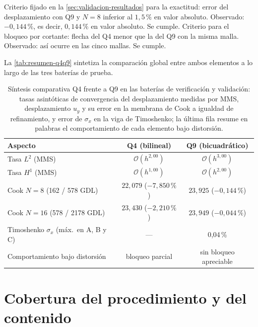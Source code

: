 Criterio fijado en la \autoref{sec:validacion-resultados} para la exactitud: error del desplazamiento con Q9 y $N=8$ inferior al $1{,}5\,\%$ en valor absoluto. Observado: $-0{,}144\,\%$, es decir, $0{,}144\,\%$ en valor absoluto. Se cumple. Criterio para el bloqueo por cortante: flecha del Q4 menor que la del Q9 con la misma malla. Observado: así ocurre en las cinco mallas. Se cumple.

La \autoref{tab:resumen-q4q9} sintetiza la comparación global entre ambos elementos a lo largo de las tres baterías de prueba.

\begin{table}[htbp]
\centering
\caption[Síntesis comparativa Q4 frente a Q9 en las baterías de verificación y validación.]{Síntesis comparativa Q4 frente a Q9 en las baterías de verificación y validación: tasas asintóticas de convergencia del desplazamiento medidas por MMS, desplazamiento $u_y$ y su error en la membrana de Cook a igualdad de refinamiento, y error de $\sigma_x$ en la viga de Timoshenko; la última fila resume en palabras el comportamiento de cada elemento bajo distorsión.}
\label{tab:resumen-q4q9}
\begin{tabular}{l c c}
\hline
Aspecto & Q4 (bilineal) & Q9 (bicuadrático) \\
\hline
Tasa $L^2$ (MMS)              & $\mathcal{O}(h^{2{,}00})$ & $\mathcal{O}(h^{3{,}00})$ \\
Tasa $H^1$ (MMS)              & $\mathcal{O}(h^{1{,}00})$ & $\mathcal{O}(h^{2{,}00})$ \\
Cook $N=8$ (162 / 578 GDL)    & $22{,}079$ ($-7{,}850\,\%$) & $23{,}925$ ($-0{,}144\,\%$) \\
Cook $N=16$ (578 / 2178 GDL)  & $23{,}430$ ($-2{,}210\,\%$) & $23{,}949$ ($-0{,}044\,\%$) \\
Timoshenko $\sigma_x$ (máx.\ en A, B y C) & --- & 0,04\,\% \\
Comportamiento bajo distorsión & bloqueo parcial & sin bloqueo apreciable \\
\hline
\end{tabular}
{\singlespacing{}}
\end{table}

\section{Cobertura del procedimiento y del contenido}
\label{sec:cobertura}

